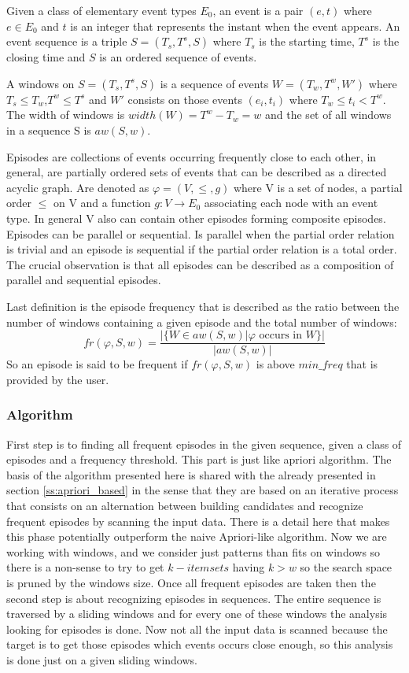 Given a class of elementary event types $E_{0}$, an event is a pair $(e,t)$
where $e \in E_{0}$ and $t$ is an integer that represents the instant when
the event appears. An event sequence is a triple $S=(T_{s},T^{s},S)$ where
$T_{s}$ is the starting time, $T^{s}$ is the closing time and $S$ is an ordered
sequence of events.

A windows on $S=(T_{s},T^{s},S)$ is a sequence of events $W=(T_{w},T^{w},W')$
where $T_{s} \leq T_{w}$,$T^{w} \leq T^{s}$ and $W'$ consists on those events
$(e_{i},t_{i})$ where $T_{w} \leq t_{i} < T^{w}$. The width of windows is
$width(W)=T^{w}-T_{w}=w$ and the set of all windows in a sequence S is
$aw(S,w)$. 

Episodes are collections of events occurring frequently close to each other, in
general, are partially ordered sets of events that can be described as a
directed acyclic graph. Are denoted as $\varphi =(V,\le,g)$ where V is a set of
nodes, a partial order $\le$ on V and a function $g:V \rightarrow E_{0}$
associating each node with an event type. In general V also can contain other
episodes forming composite episodes. Episodes can be parallel or sequential.
Is parallel when the partial order relation is trivial and an episode is
sequential if the partial order relation is a total order. The crucial
observation is that all episodes can be described as a composition of parallel
and sequential episodes.

Last definition is the episode frequency that is described as the ratio between
the number of windows containing a given episode and the total number of
windows:
$$
fr(\varphi,S,w)=\frac{|\text{\{}W \in aw(S,w) | \varphi \text{ occurs in }
W\text{\}}|}{|aw(S,w)|}
$$
So an episode is said to be frequent if $fr(\varphi,S,w)$ is above $min\text{\_}freq$
that is provided by the user.

\subsubsection{Algorithm}

First step is to finding all frequent episodes in the given sequence, given a
class of episodes and a frequency threshold. This part is just like apriori
algorithm. The basis of the algorithm presented here is shared with the already 
presented in section \ref{ss:apriori_based} in the sense that they are based on an
iterative process that consists on an alternation between building candidates 
and recognize frequent episodes by scanning the input data. There is a detail
here that makes this phase potentially outperform the naive Apriori-like
algorithm. Now we are working with windows, and we consider just patterns than
fits on windows so there is a non-sense to try to get $k-itemsets$ having $k >
w$ so the search space is pruned by the windows size. Once all frequent 
episodes are taken then the second step is about recognizing episodes in 
sequences. The entire sequence is traversed by a sliding windows and for every one of these windows the analysis looking for episodes is done. 
Now not all the input data is scanned because the target is to get those 
episodes which events occurs close enough, so this analysis is done
just on a given sliding windows. 

